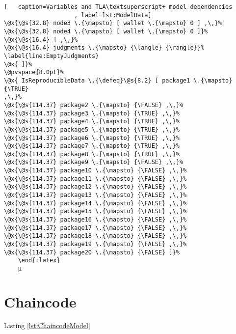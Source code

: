 \begin{lstlisting}[	  caption=Variables and TLA\textsuperscript+ model dependencies
					, label=lst:ModelData]
\@x{\@s{32.8} node3 \.{\mapsto} [ wallet \.{\mapsto} 0 ] ,\,}%
\@x{\@s{32.8} node4 \.{\mapsto} [ wallet \.{\mapsto} 0 ]}%
\@x{\@s{16.4} ] ,\,}%
\@x{\@s{16.4} judgments \.{\mapsto} {\langle} {\rangle}}%
\label{line:EmptyJudgments}
\@x{ ]}%
\@pvspace{8.0pt}%
\@x{ IsReproducibleData \.{\defeq}\@s{8.2} [ package1 \.{\mapsto} {\TRUE}
,\,}%
\@x{\@s{114.37} package2 \.{\mapsto} {\FALSE} ,\,}%
\@x{\@s{114.37} package3 \.{\mapsto} {\TRUE} ,\,}%
\@x{\@s{114.37} package4 \.{\mapsto} {\TRUE} ,\,}%
\@x{\@s{114.37} package5 \.{\mapsto} {\TRUE} ,\,}%
\@x{\@s{114.37} package6 \.{\mapsto} {\TRUE} ,\,}%
\@x{\@s{114.37} package7 \.{\mapsto} {\TRUE} ,\,}%
\@x{\@s{114.37} package8 \.{\mapsto} {\TRUE} ,\,}%
\@x{\@s{114.37} package9 \.{\mapsto} {\FALSE} ,\,}%
\@x{\@s{114.37} package10 \.{\mapsto} {\FALSE} ,\,}%
\@x{\@s{114.37} package11 \.{\mapsto} {\FALSE} ,\,}%
\@x{\@s{114.37} package12 \.{\mapsto} {\FALSE} ,\,}%
\@x{\@s{114.37} package13 \.{\mapsto} {\FALSE} ,\,}%
\@x{\@s{114.37} package14 \.{\mapsto} {\FALSE} ,\,}%
\@x{\@s{114.37} package15 \.{\mapsto} {\FALSE} ,\,}%
\@x{\@s{114.37} package16 \.{\mapsto} {\FALSE} ,\,}%
\@x{\@s{114.37} package17 \.{\mapsto} {\FALSE} ,\,}%
\@x{\@s{114.37} package18 \.{\mapsto} {\FALSE} ,\,}%
\@x{\@s{114.37} package19 \.{\mapsto} {\FALSE} ,\,}%
\@x{\@s{114.37} package20 \.{\mapsto} {\FALSE} ]}%
	\end{tlatex}
	µ
\end{lstlisting}

\section{Chaincode}
\label{subsec:ModelChaincode}

Listing \ref{lst:ChaincodeModel}

